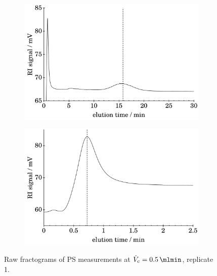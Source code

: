 \begin{figure}[t!]
\begin{center}
    \\\vspace*{.5em}
  \begin{subfigure}{\subFigSize} 
    \includegraphics[width=\linewidth]{./images/data/rawPlots/img_PS_VC_05_rep1_te_RI.pdf}
    \label{subfig:raw_PS2_5_r1_te_RI}
  \end{subfigure}
  \begin{subfigure}{\subFigSize}
    \includegraphics[width=\linewidth]{./images/data/rawPlots/img_PS_VC_05_rep1_t0_RI.pdf}
\end{subfigure}
  \end{center}
\vspace*{-3ex}    
\caption[Raw fractograms of PS measurements at $\Vc = \SI{0.5}{\mlmin}$, replicate 1.]{
Raw fractograms of PS 
measurements at $\Vc = \SI{0.5}{\mlmin}$, replicate 1.}
\label{fig:raw_PS_0_5_rep1} 
\end{figure}\needspace{10ex}
